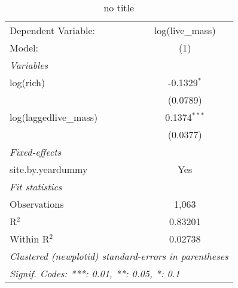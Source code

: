 
\begin{table}[htbp]
   \caption{no title}
   \centering
   \begin{tabular}{lc}
      \tabularnewline \midrule \midrule
      Dependent Variable:    & log(live\_mass)\\   
      Model:                 & (1)\\  
      \midrule
      \emph{Variables}\\
      log(rich)              & -0.1329$^{*}$\\   
                             & (0.0789)\\   
      log(laggedlive\_mass)  & 0.1374$^{***}$\\   
                             & (0.0377)\\   
      \midrule
      \emph{Fixed-effects}\\
      site.by.yeardummy      & Yes\\  
      \midrule
      \emph{Fit statistics}\\
      Observations           & 1,063\\  
      R$^2$                  & 0.83201\\  
      Within R$^2$           & 0.02738\\  
      \midrule \midrule
      \multicolumn{2}{l}{\emph{Clustered (newplotid) standard-errors in parentheses}}\\
      \multicolumn{2}{l}{\emph{Signif. Codes: ***: 0.01, **: 0.05, *: 0.1}}\\
   \end{tabular}
\end{table}


